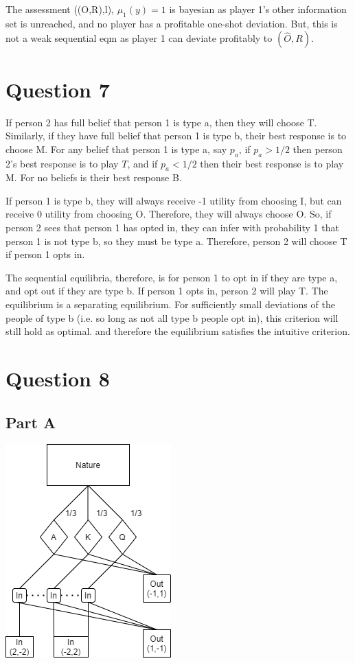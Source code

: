 \documentclass[11pt]{article} %
\begin{document}
The assessment ((O,R),l), $\mu_1(y) = 1$ is bayesian as player 1's other information set is unreached, and no player has a profitable one-shot deviation. But, this is not a weak sequential eqm as player 1 can deviate profitably to $(\hat{O},R)$. 


\section{Question 7}
If person 2 has full belief that person 1 is type a, then they will choose T. Similarly, if they have full belief that person 1 is type b, their best response is to choose M. For any belief that person 1 is type a, say $p_a$, if $p_a> 1/2$ then person 2's best response is to play $T$, and if $p_a<1/2$ then their best response is to play M. For no beliefs is their best response B.

If person 1 is type b, they will always receive -1 utility from choosing I, but can receive 0 utility from choosing O. Therefore, they will always choose O. So, if person 2 sees that person 1 has opted in, they can infer with probability 1 that person 1 is not type b, so they must be type a. Therefore, person 2 will choose T if person 1 opts in.

The sequential equilibria, therefore, is for person 1 to opt in if they are type a, and opt out if they are type b. If person 1 opts in, person 2 will play T. The equilibrium is a separating equilibrium. For sufficiently small deviations of the people of type b (i.e. so long as not all type b people opt in), this criterion will still hold as optimal. and therefore the equilibrium satisfies the intuitive criterion.
\section{Question 8}
\subsection{Part A}

\begin{center}
\includegraphics{diag}
\end{center}
\end{document}

